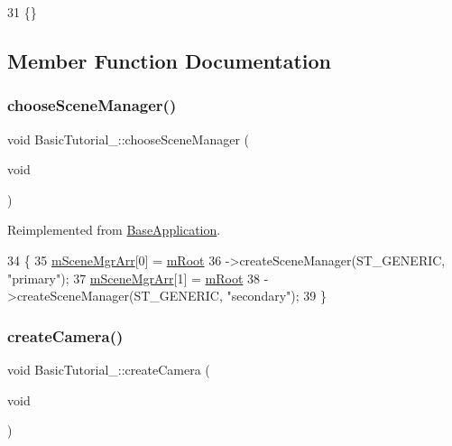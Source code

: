 \begin{DoxyCode}
31 \{\}
\end{DoxyCode}


\subsection{Member Function Documentation}
\mbox{\label{class_basic_tutorial__00_aba97a29d983586d2dc8e108d3bccf721}} 
\subsubsection{\texorpdfstring{choose\+Scene\+Manager()}{chooseSceneManager()}}
{\footnotesize\ttfamily void Basic\+Tutorial\+\_\+::choose\+Scene\+Manager (\begin{DoxyParamCaption}\item[{void}]{ }\end{DoxyParamCaption})\hspace{0.3cm}{\ttfamily [virtual]}}



Reimplemented from \hyperlink{class_base_application_ad5bc9655041e1849a4c13f444a3712bd}{Base\+Application}.


\begin{DoxyCode}
34 \{
35     \hyperlink{class_basic_tutorial__00_a603779b6087698c57b7989e16d8a9b93}{mSceneMgrArr}[0] = \hyperlink{class_base_application_add84ba707dc6c57e6283f214b1274110}{mRoot}
36         ->createSceneManager(ST\_GENERIC, \textcolor{stringliteral}{"primary"});
37     \hyperlink{class_basic_tutorial__00_a603779b6087698c57b7989e16d8a9b93}{mSceneMgrArr}[1] = \hyperlink{class_base_application_add84ba707dc6c57e6283f214b1274110}{mRoot}
38         ->createSceneManager(ST\_GENERIC, \textcolor{stringliteral}{"secondary"});
39 \}
\end{DoxyCode}
\mbox{\label{class_basic_tutorial__00_a1bf709417d654dffc2ea10987412b912}} 
\subsubsection{\texorpdfstring{create\+Camera()}{createCamera()}}
{\footnotesize\ttfamily void Basic\+Tutorial\+\_\+::create\+Camera (\begin{DoxyParamCaption}\item[{void}]{ }\end{DoxyParamCaption})\hspace{0.3cm}{\ttfamily [virtual]}}



